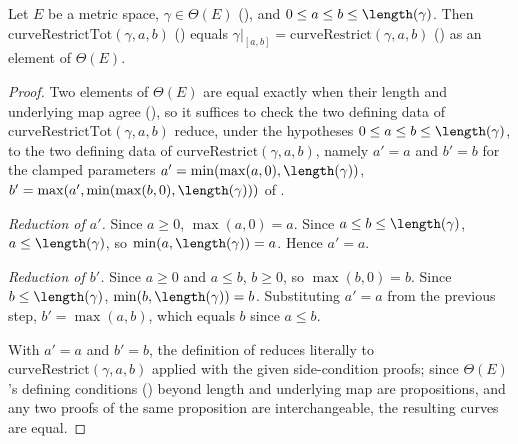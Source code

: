 \begin{helper}
  Let $E$ be a metric space, $\gamma \in \Theta(E)$ (), and $0 \le a \le b \le
  \length(\gamma)$. Then $\mathrm{curveRestrictTot}(\gamma,a,b)$ ()
  equals $\gamma|_{[a,b]} = \mathrm{curveRestrict}(\gamma,a,b)$ () as an
  element of $\Theta(E)$.
\end{helper}
\begin{proof}
  Two elements of $\Theta(E)$ are equal exactly when their length and underlying map agree
  (), so it suffices to check the two defining data of
  $\mathrm{curveRestrictTot}(\gamma,a,b)$ reduce, under the hypotheses $0 \le a \le b \le
  \length(\gamma)$, to the two defining data of $\mathrm{curveRestrict}(\gamma,a,b)$, namely
  $a' = a$ and $b' = b$ for the clamped parameters
  $a' = \min(\max(a,0),\length(\gamma))$, $b' = \max(a',\min(\max(b,0),\length(\gamma)))$ of
  .

  \emph{Reduction of $a'$.} Since $a \ge 0$, $\max(a,0) = a$. Since $a \le b \le \length(\gamma)$,
  $a \le \length(\gamma)$, so $\min(a,\length(\gamma)) = a$. Hence $a' = a$.

  \emph{Reduction of $b'$.} Since $a \ge 0$ and $a \le b$, $b \ge 0$, so $\max(b,0) = b$. Since
  $b \le \length(\gamma)$, $\min(b,\length(\gamma)) = b$. Substituting $a' = a$ from the previous
  step, $b' = \max(a, b)$, which equals $b$ since $a \le b$.

  With $a' = a$ and $b' = b$, the definition of  reduces literally to
  $\mathrm{curveRestrict}(\gamma,a,b)$ applied with the given side-condition proofs; since $\Theta(E)$'s
  defining conditions () beyond length and underlying map are propositions, and any
  two proofs of the same proposition are interchangeable, the resulting curves are equal.
\end{proof}
